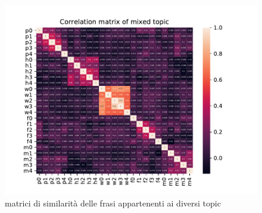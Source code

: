 \begin{figure}[h!t]
    \centering
    \includegraphics{Figure/simMatr/mixed.pdf}
    \caption{matrici di similarità delle frasi appartenenti ai diversi topic}
    \label{fig:mtrsim_mix}
\end{figure}
\FloatBarrier
